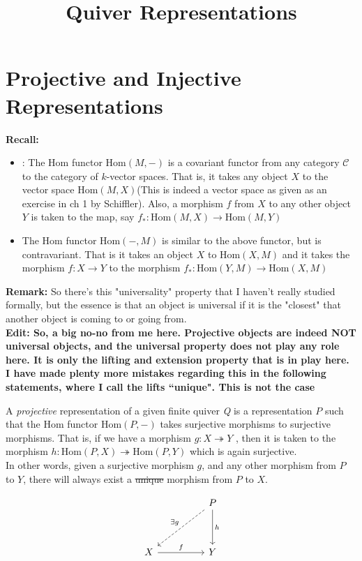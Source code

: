 \documentclass[12pt]{article}
\title{Quiver Representations}
\begin{document}
\maketitle
\section*{Projective and Injective Representations}
\textbf{Recall:}
\begin{itemize}
    \item : The Hom functor Hom$(M,-)$ is a covariant functor from any category $\mathcal{C}$ to the category of $k$-vector spaces. That is, it takes any object $X$ to the vector space Hom$(M,X)$(This is indeed a vector space as given as an exercise in ch 1 by Schiffler). Also, a morphism $f$ from $X$ to any other object $Y$ is taken to the map, say $f_*: \text{Hom}(M,X) \to \text{Hom}(M,Y)$
    \item The Hom functor Hom$(-,M)$ is similar to the above functor, but is contravariant. That is it takes an object $X$ to Hom$(X,M)$ and it takes the morphism $f: X \to Y$ to the morphism $f_* : \text{Hom}(Y,M) \to \text{Hom}(X,M)$
\end{itemize}

    \textbf{Remark: } So there's this "universality" property that I haven't really studied formally, but the essence is that an object is universal if it is the "closest" that another object is coming to or going from. \\\textbf{Edit: So, a big no-no from me here. Projective objects are indeed NOT universal objects, and the universal property does not play any role here. It is only the lifting and extension property that is in play here. I have made plenty more mistakes regarding this in the following statements, where I call the lifts ``unique". This is not the case}

 A \textit{projective} representation of a given finite quiver \textit{Q} is a representation $P$ such that the Hom functor Hom$(P,-)$ takes surjective morphisms to surjective morphisms. That is, if we have a morphism $g:X \twoheadrightarrow Y$ , then it is taken to the morphism $h: \text{Hom}(P,X) \twoheadrightarrow \text{Hom}(P,Y)$ which is again surjective.\\ In other words, given a surjective morphism $g$, and any other morphism from $P$ to $Y$, there will always exist a \sout{unique} morphism from $P$ to $X$. 

 \[
\begin{tikzcd}[row sep=huge, column sep=huge]
&P \arrow[dl,dashed,"\exists g"'] \arrow[d,"h"]  \\ 
X \arrow[r, "f"] &Y 
\end{tikzcd}
\]
\end{document}

